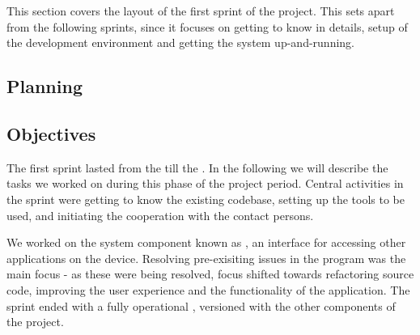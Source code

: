 This section covers the layout of the first sprint of the project.
This sets apart from the following sprints, since it focuses on getting to know \giraf in details, setup of the development environment and getting the system up-and-running.

\subsection{Planning}


\subsection{Objectives}
The first sprint lasted from the  till the .
In the following we will describe the tasks we worked on during this phase of the project period. 
Central activities in the sprint were getting to know the existing codebase, setting up the tools to be used, and initiating the cooperation with the contact persons.

We worked on the system component known as \textit{\launcher}, an interface for accessing other \giraf applications on the device.
Resolving pre-exisiting issues in the program was the main focus - as these were being resolved, focus shifted towards refactoring source code, improving the user experience and the functionality of the application.
The sprint ended with a fully operational \launcher, versioned with the other components of the project.